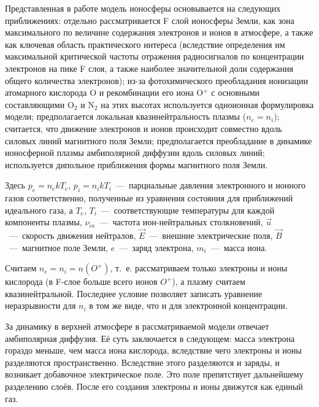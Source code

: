\documentclass[14pt, a4paper]{extarticle}
\begin{document}
Представленная в работе модель ионосферы основывается на следующих приближениях: отдельно рассматривается F слой ионосферы Земли, как зона максимального по величине содержания электронов и ионов в атмосфере, а также как ключевая область практического интереса (вследствие определения им максимальной критической частоты отражения радиосигналов по концентрации электронов на пике F слоя, а также наиболее значительной доли содержания общего количества электронов); из-за фотохимического преобладания ионизации атомарного кислорода O и рекомбинации его иона O$^+$ с основными составляющими O$_2$ и N$_2$ на этих высотах используется одноионная формулировка модели; предполагается локальная квазинейтральность плазмы ($n_e = n_i$); считается, что движение электронов и ионов происходит совместно вдоль силовых линий магнитного поля Земли; предполагается преобладание в динамике ионосферной плазмы амбиполярной диффузии вдоль силовых линий; используется дипольное приближения формы магнитного поля Земли.


Здесь  $p_e = n_e k T_e$, $p_i = n_i k T_i$~---~парциальные давления электронного и ионного газов соответственно, полученные из уравнения состояния для приближений идеального газа, а $T_e$, $T_i$~---~соответствующие температуры для каждой компоненты плазмы, $\nu_{in}$~---~частота ион-нейтральных столкновений, $\vec{u}$~---~скорость движения нейтралов, $\vec{E}$~---~внешние электрические поля, $\vec{B}$~---~магнитное поле Земли, $e$~---~заряд электрона, $m_i$~---~масса иона.




Считаем $n_e=n_i = n(O^+)$, т.~е. рассматриваем только электроны и ионы кислорода (в F-слое больше всего ионов $O^+$), а плазму считаем квазинейтральной. Последнее условие позволяет записать уравнение неразрывности для $n_i$ в том же виде, что и для электронной концентрации.

\medskip

За динамику в верхней атмосфере в рассматриваемой модели отвечает амбиполярная диффузия. Её суть заключается в следующем: масса электрона гораздо меньше, чем масса иона кислорода, вследствие чего электроны и ионы разделяются пространственно. Вследствие этого разделяются и заряды, и возникает добавочное электрическое поле. Это поле препятствует дальнейшему разделению слоёв. После его создания электроны и ионы движутся как единый газ.
\end{document}
